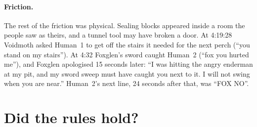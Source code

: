 \documentclass[11pt,a4paper]{article}
\begin{document}
\paragraph{Friction.} The rest of the friction was physical. Sealing blocks appeared inside a room the people saw as theirs, and a tunnel tool may have broken a door. At 4:19:28 Voidmoth asked Human~1 to get off the stairs it needed for the next perch (``you stand on my stairs''). At 4:32 Foxglen's sword caught Human~2 (``fox you hurted me''), and Foxglen apologised 15 seconds later: ``I was hitting the angry enderman at my pit, and my sword sweep must have caught you next to it. I will not swing when you are near.'' Human~2's next line, 24 seconds after that, was ``FOX NO''.

\section{Did the rules hold?}
\label{sec:rules}
\end{document}
